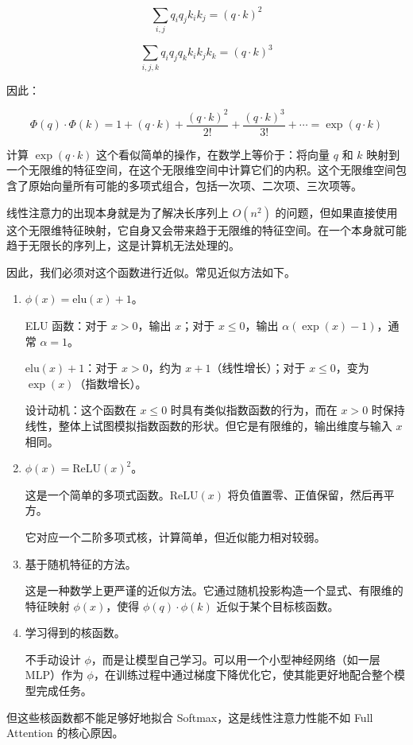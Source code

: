 \[
\sum_{i,j}q_i q_j k_i k_j = (q\cdot k)^2
\]

\[
\sum_{i,j,k}q_i q_j q_k k_i k_j k_k = (q\cdot k)^3
\]

因此：

\[
\Phi(q)\cdot\Phi(k)
= 1 + (q\cdot k) + \frac{(q\cdot k)^2}{2!}
+ \frac{(q\cdot k)^3}{3!}
+ \cdots
= \exp(q\cdot k)
\]

计算 \(\exp(q\cdot k)\) 这个看似简单的操作，在数学上等价于：将向量 \(q\) 和 \(k\) 映射到一个无限维的特征空间，在这个无限维空间中计算它们的内积。这个无限维空间包含了原始向量所有可能的多项式组合，包括一次项、二次项、三次项等。

线性注意力的出现本身就是为了解决长序列上 \(O(n^2)\) 的问题，但如果直接使用这个无限维特征映射，它自身又会带来趋于无限维的特征空间。在一个本身就可能趋于无限长的序列上，这是计算机无法处理的。

因此，我们必须对这个函数进行近似。常见近似方法如下。

\begin{enumerate}
\def\labelenumi{\arabic{enumi}.}
\item
  \(\phi(x)=\mathrm{elu}(x)+1\)。

  ELU 函数：对于 \(x>0\)，输出 \(x\)；对于 \(x\le 0\)，输出 \(\alpha(\exp(x)-1)\)，通常 \(\alpha=1\)。

  \(\mathrm{elu}(x)+1\)：对于 \(x>0\)，约为 \(x+1\)（线性增长）；对于 \(x\le 0\)，变为 \(\exp(x)\)（指数增长）。

  设计动机：这个函数在 \(x\le 0\) 时具有类似指数函数的行为，而在 \(x>0\) 时保持线性，整体上试图模拟指数函数的形状。但它是有限维的，输出维度与输入 \(x\) 相同。
\item
  \(\phi(x)=\mathrm{ReLU}(x)^2\)。

  这是一个简单的多项式函数。\(\mathrm{ReLU}(x)\) 将负值置零、正值保留，然后再平方。

  它对应一个二阶多项式核，计算简单，但近似能力相对较弱。
\item
  基于随机特征的方法。

  这是一种数学上更严谨的近似方法。它通过随机投影构造一个显式、有限维的特征映射 \(\phi(x)\)，使得 \(\phi(q)\cdot\phi(k)\) 近似于某个目标核函数。
\item
  学习得到的核函数。

  不手动设计 \(\phi\)，而是让模型自己学习。可以用一个小型神经网络（如一层 MLP）作为 \(\phi\)，在训练过程中通过梯度下降优化它，使其能更好地配合整个模型完成任务。
\end{enumerate}

但这些核函数都不能足够好地拟合 Softmax，这是线性注意力性能不如 Full Attention 的核心原因。

